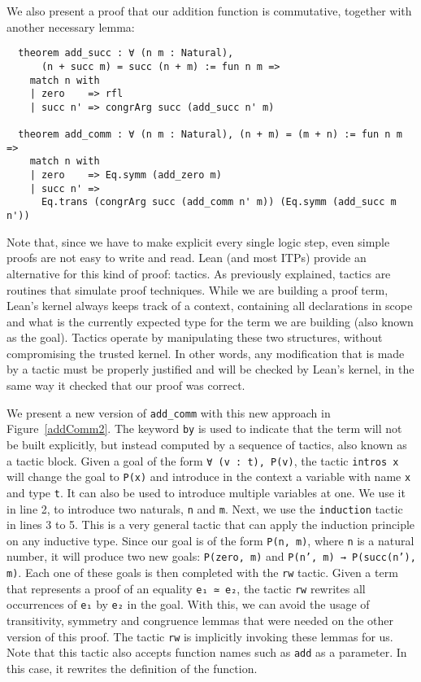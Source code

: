 We also present a proof that our addition function is commutative, together with another necessary lemma:

\begin{verbatim}
  theorem add_succ : ∀ (n m : Natural),
      (n + succ m) = succ (n + m) := fun n m =>
    match n with
    | zero    => rfl
    | succ n' => congrArg succ (add_succ n' m)

  theorem add_comm : ∀ (n m : Natural), (n + m) = (m + n) := fun n m =>
    match n with
    | zero    => Eq.symm (add_zero m)
    | succ n' =>
      Eq.trans (congrArg succ (add_comm n' m)) (Eq.symm (add_succ m n'))
\end{verbatim}

Note that, since we have to make explicit every single logic step, even simple proofs are not easy to write and read. Lean (and most ITPs) provide an alternative for this kind of proof: tactics. As previously explained, tactics are routines that simulate proof techniques. While we are building a proof term, Lean's kernel always keeps track of a context, containing all declarations in scope and what is the currently expected type for the term we are building (also known as the goal). Tactics operate by manipulating these two structures, without compromising the trusted kernel. In other words, any modification that is made by a tactic must be properly justified and will be checked by Lean's kernel, in the same way it checked that our proof was correct.

We present a new version of \texttt{add\_comm} with this new approach in Figure~\ref{addComm2}.
The keyword \texttt{by} is used to indicate that the term will not be built explicitly, but instead computed by a sequence of tactics, also known as a tactic block. Given a goal of the form \texttt{∀ (v : t), P(v)}, the tactic \texttt{intros x} will change the goal to \texttt{P(x)} and introduce in the context a variable with name \texttt{x} and type \texttt{t}. It can also be used to introduce multiple variables at one. We use it in line 2, to introduce two naturals, \texttt{n} and \texttt{m}. Next, we use the \texttt{induction} tactic in lines 3 to 5. This is a very general tactic that can apply the induction principle on any inductive type. Since our goal is of the form \texttt{P(n, m)}, where \texttt{n} is a natural number, it will produce two new goals: \texttt{P(zero, m)} and \texttt{P(n', m) → P(succ(n'), m)}. Each one of these goals is then completed with the \texttt{rw} tactic. Given a term that represents a proof of an equality \texttt{e₁ ≃ e₂}, the tactic \texttt{rw} rewrites all occurrences of \texttt{e₁} by \texttt{e₂} in the goal. With this, we can avoid the usage of transitivity, symmetry and congruence lemmas that were needed on the other version of this proof. The tactic \texttt{rw} is implicitly invoking these lemmas for us. Note that this tactic also accepts function names such as \texttt{add} as a parameter. In this case, it rewrites the definition of the function.

